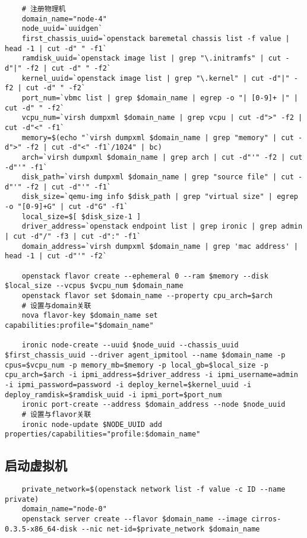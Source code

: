 \documentclass[a4paper,left=1.5cm,right=1.5cm,11pt]{article}
\begin{document}
	\begin{lstlisting}
	# 注册物理机
	domain_name="node-4"
	node_uuid=`uuidgen`
	first_chassis_uuid=`openstack baremetal chassis list -f value | head -1 | cut -d" " -f1`
	ramdisk_uuid=`openstack image list | grep "\.initramfs" | cut -d"|" -f2 | cut -d" " -f2`
	kernel_uuid=`openstack image list | grep "\.kernel" | cut -d"|" -f2 | cut -d" " -f2`
	port_num=`vbmc list | grep $domain_name | egrep -o "| [0-9]+ |" | cut -d" " -f2`
	vcpu_num=`virsh dumpxml $domain_name | grep vcpu | cut -d">" -f2 | cut -d"<" -f1`
	memory=$(echo "`virsh dumpxml $domain_name | grep "memory" | cut -d">" -f2 | cut -d"<" -f1`/1024" | bc)
	arch=`virsh dumpxml $domain_name | grep arch | cut -d"'" -f2 | cut -d"'" -f1`
	disk_path=`virsh dumpxml $domain_name | grep "source file" | cut -d"'" -f2 | cut -d"'" -f1`
	disk_size=`qemu-img info $disk_path | grep "virtual size" | egrep -o "[0-9]+G" | cut -d"G" -f1`
	local_size=$[ $disk_size-1 ]
	driver_address=`openstack endpoint list | grep ironic | grep admin | cut -d"/" -f3 | cut -d":" -f1`
	domain_address=`virsh dumpxml $domain_name | grep 'mac address' | head -1 | cut -d"'" -f2`

	openstack flavor create --ephemeral 0 --ram $memory --disk $local_size --vcpus $vcpu_num $domain_name
	openstack flavor set $domain_name --property cpu_arch=$arch
	# 设置与domain关联
	nova flavor-key $domain_name set capabilities:profile="$domain_name"

	ironic node-create --uuid $node_uuid --chassis_uuid $first_chassis_uuid --driver agent_ipmitool --name $domain_name -p cpus=$vcpu_num -p memory_mb=$memory -p local_gb=$local_size -p cpu_arch=$arch -i ipmi_address=$driver_address -i ipmi_username=admin -i ipmi_password=password -i deploy_kernel=$kernel_uuid -i deploy_ramdisk=$ramdisk_uuid -i ipmi_port=$port_num
	ironic port-create --address $domain_address --node $node_uuid
	# 设置与flavor关联
	ironic node-update $NODE_UUID add properties/capabilities="profile:$domain_name"
	\end{lstlisting}

\subsection{启动虚拟机}
	\begin{lstlisting}
	private_network=$(openstack network list -f value -c ID --name private)
	domain_name="node-0"
	openstack server create --flavor $domain_name --image cirros-0.3.5-x86_64-disk --nic net-id=$private_network $domain_name
	\end{lstlisting}
\end{document}
